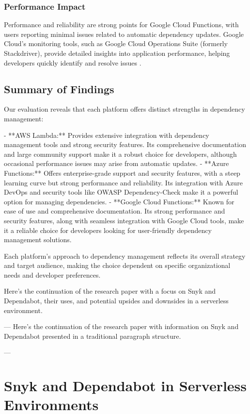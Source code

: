 \documentclass[12pt, letterpaper]{article}
\begin{document}
\subsubsection{Performance Impact}

Performance and reliability are strong points for Google Cloud Functions, with users reporting minimal issues related to automatic dependency updates. Google Cloud's monitoring tools, such as Google Cloud Operations Suite (formerly Stackdriver), provide detailed insights into application performance, helping developers quickly identify and resolve issues \cite{googlePerformance2023}.

\subsection{Summary of Findings}

Our evaluation reveals that each platform offers distinct strengths in dependency management:

- **AWS Lambda:** Provides extensive integration with dependency management tools and strong security features. Its comprehensive documentation and large community support make it a robust choice for developers, although occasional performance issues may arise from automatic updates.
- **Azure Functions:** Offers enterprise-grade support and security features, with a steep learning curve but strong performance and reliability. Its integration with Azure DevOps and security tools like OWASP Dependency-Check make it a powerful option for managing dependencies.
- **Google Cloud Functions:** Known for ease of use and comprehensive documentation. Its strong performance and security features, along with seamless integration with Google Cloud tools, make it a reliable choice for developers looking for user-friendly dependency management solutions.

Each platform's approach to dependency management reflects its overall strategy and target audience, making the choice dependent on specific organizational needs and developer preferences.


Here's the continuation of the research paper with a focus on Snyk and Dependabot, their uses, and potential upsides and downsides in a serverless environment.

---
Here's the continuation of the research paper with information on Snyk and Dependabot presented in a traditional paragraph structure.

---

\section{Snyk and Dependabot in Serverless Environments}
\end{document}
